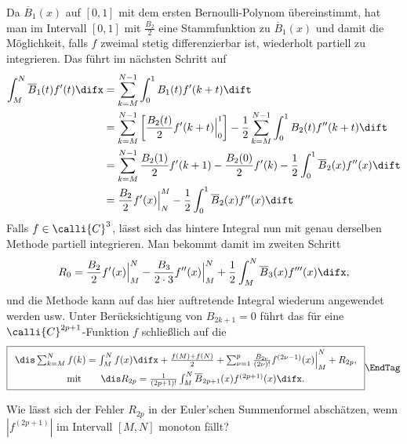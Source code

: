   \begin{antwort}
    Da $\overline{B}_1(x)$ auf $[0,1]$ mit dem 
    ersten Bernoulli-Polynom übereinstimmt, hat man 
    im Intervall $[0,1]$ mit $\frac{B_2}{2}$ eine 
    Stammfunktion zu $\overline{B}_1(x)$ und damit die 
    Möglichkeit, falls $f$ 
    zweimal stetig differenzierbar ist, wiederholt partiell zu integrieren. 
    Das führt im nächsten Schritt auf 
    \begin{align*}
      \int_M^N \overline{B}_1 (t) f'(t) \difx &=  
      \sum_{k=M}^{N-1} \int_0^1 B_1(t) f'(k+t) \dift \\ &=
      \sum_{k=M}^{N-1} \left[ \frac{B_2(t)}{2} f'(k+t) \Big|_0^1 \right]  - 
      \frac{1}{2} \sum_{k=M}^{N-1} \int_0^1 B_2(t) f''(k+t)\dift \\
      &= \sum_{k=M}^{N-1} \frac{B_2(1)}{2} f'(k+1)- \frac{B_2(0)}{2} f'(k)  - 
      \frac{1}{2} \int_0^1 \overline{B}_2(x) f''(x)\dift \\
      &= \frac{B_2}{2} f'(x) \Big|_N^M   - 
      \frac{1}{2} \int_0^1 \overline{B}_2(x) f''(x)\dift
    \end{align*}
    Falls $f\in \calli{C}^3$, lässt sich 
    das hintere Integral nun mit genau derselben Methode partiell integrieren.  
    Man bekommt damit im zweiten Schritt
    \[
    R_0 =  \frac{B_2}{2} f'(x) \Big|_M^N - 
    \frac{B_3}{2\cdot 3} f''(x) \Big|_M^N +
    \frac{1}{2}\int_M^N \overline{B}_3 (x) f'''(x) \difx,    
    \]
    und die Methode kann auf das hier auftretende Integral wiederum  
    angewendet werden usw. 
    Unter Berücksichtigung von $B_{2k+1}=0$ führt das  für 
    eine $\calli{C}^{2p+1}$-Funktion $f$ schließlich auf die 
    \[\boxed{
      \begin{array}{c}
        \dis \sum_{k=M}^N f(k)= \int_M^N f(x) \difx + 
        \frac{f(M)+f(N)}{2}
        + 
        \sum_{\nu=1}^{p} \frac{B_{2\nu}}{(2\nu)!} f^{(2\nu-1)}(x) \Big|_M^N +
        R_{2p}, \notag \\[2mm]
        \text{mit}\qquad\dis 
        R_{2p} = 
        \frac{1}{(2p+1)!}
        \int_M^N\overline{B}_{2p+1} (x) f^{(2p+1)}(x) 
        \difx.
      \end{array}}\EndTag
    \]
  \end{antwort}

  \begin{frage}
    Wie lässt sich der Fehler $R_{2p}$ in der Euler'schen 
    Summenformel abschätzen, wenn 
    $\left| f^{(2p+1)}\right|$ im Intervall $[M,N]$ monoton fällt?
  \end{frage}


